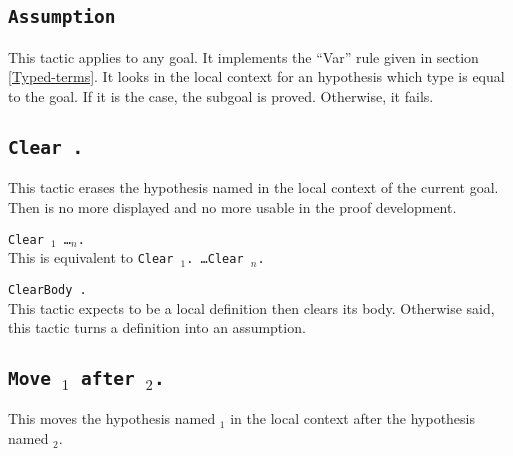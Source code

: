 \subsection{{\tt Assumption}}
This tactic applies to any goal. It implements the
``Var'' rule given in section
\ref{Typed-terms}. It looks in the local context for an hypothesis
which type is equal to the goal.  If it is the case, the subgoal is
proved. Otherwise, it fails.

\begin{ErrMsgs}
\item  {}
\end{ErrMsgs}

\subsection{\tt Clear {\ident}.}\label{Clear}
This tactic erases the hypothesis named {\ident} in the local context
of the current goal. Then {\ident} is no more displayed and no more
usable in the proof development.

\begin{Variants}
\item {\tt Clear {\ident$_1$} \ldots {\ident$_n$}.}\\
This is equivalent to {\tt Clear {\ident$_1$}. \ldots Clear {\ident$_n$}.}

\item {\tt ClearBody {\ident}.}\\
This tactic expects {\ident} to be a local definition then clears its
body. Otherwise said, this tactic turns a definition into an assumption.
\end{Variants}

\begin{ErrMsgs}
\item {}
\item {}
\item {}
\end{ErrMsgs}

\subsection{\tt Move {\ident$_1$} after {\ident$_2$}.}
This moves the hypothesis named {\ident$_1$} in the local context
after the hypothesis named {\ident$_2$}.

